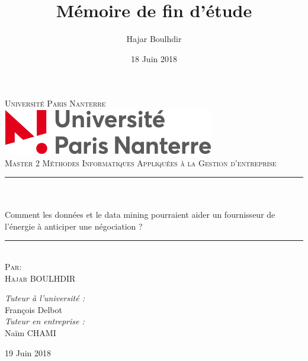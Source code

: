 \documentclass[12pt]{article}
\title{ Mémoire de fin d'étude }								%
\author{Hajar Boulhdir}								%
\date{18 Juin 2018}											%
\makeatletter
\let\thetitle\@title
\makeatother
\begin{document}
\begin{titlepage}
	\begin{center}
	 \vspace*{0.5 cm}
    \textsc{\LARGE Université Paris Nanterre }\\[1.0 cm]	%
    \includegraphics[scale = 0.5]{UPN.jpg}
   \vspace{2 cm}
   \\\textsc{\Large Master 2 Méthodes Informatiques Appliquées à la Gestion d'entreprise }\\[0.3 cm]				%
\vspace{1 cm}
	\rule{\linewidth}{0.2 mm} \\[0.4 cm]
	{ \huge \bfseries \thetitle}\\
    \vspace{0.4cm}
   \Large Comment les données et le data mining pourraient aider un fournisseur de l’énergie à anticiper une négociation ? \\[0.3 cm]
    \rule{\linewidth}{0.2 mm} \\[1.3 cm]
     \textsc{Par:\\ Hajar BOULHDIR}
   
	\end{center}
   
	 \vspace{0.8 cm}
     \begin{flushleft} \large
		
        \emph{Tuteur à l'université :} \\
			François Delbot \\ 
		\emph{Tuteur en entreprise :} \\
			Naïm CHAMI \\  
      \end{flushleft}
	  
          	
 
	\begin{center} 
	{\large 19 Juin 2018}\\[2 cm]
	\end{center} 
	\vfill
\end{titlepage}
\end{document}
